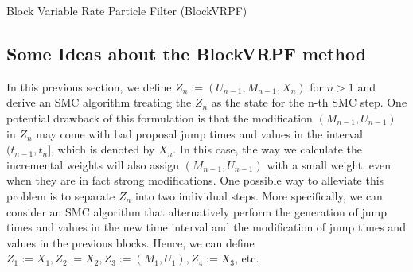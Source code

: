 \documentclass[12pt,a4paper]{article}
\begin{document}
\begin{algorithm}
    \caption{Block Variable Rate Particle Filter (BlockVRPF)}
    \label{Alg:BlockVRPF}
\end{algorithm}
    
\subsection{Some Ideas about the BlockVRPF method}
In this previous section, we define $Z_n:=(U_{n-1},M_{n-1},X_n)$ for $n>1$ and derive an SMC algorithm treating the $Z_n$ as the state for the n-th SMC step. One potential drawback of this formulation is that the modification $(M_{n-1},U_{n-1})$ in $Z_n$ may come with bad proposal jump times and values in the interval $(t_{n-1},t_n]$, which is denoted by $X_n$. In this case, the way we calculate the incremental weights will also assign $(M_{n-1},U_{n-1})$ with a small weight, even when they are in fact strong modifications. One possible way to alleviate this problem is to separate $Z_n$ into two individual steps. More specifically, we can consider an SMC algorithm that alternatively perform the generation of jump times and values in the new time interval and the modification of jump times and values in the previous blocks. Hence, we can define $Z_1:=X_1, Z_2:=X_2,Z_3:=(M_1,U_1),Z_4 := X_3$, etc. 
\end{document}

